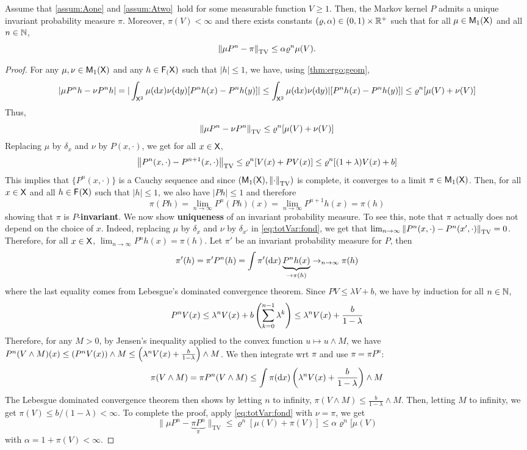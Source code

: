 \documentclass[english,graybox,envcountchap,envcountsame,sectrefs,shortlabels]{svmono}
\theoremstyle{style}
\begin{document}
\begin{corollary} \label{cor:ergod}
Assume that \ref{assum:Aone} and \ref{assum:Atwo}\ hold for some measurable function $V\geq 1$. Then, the Markov kernel $P$ admits a unique invariant probability measure $\pi$. Moreover, $\pi(V)<\infty$ and there exists constants $(\varrho,\alpha) \in (0,1) \times \mathbb{R}^+$ such that for all $\mu\in\mathsf{M}_{1}(\mathsf{X})$ and all $n\in\mathbb{N}$,
$$
\left\|\mu P^n-\pi\right\|_{\mathrm{TV}} \leq \alpha \varrho^n \mu(V)  .
$$
\end{corollary}
\begin{proof}
For any $\mu,\nu \in\mathsf{M}_{1}(\mathsf{X})$ and any $h\in\mathsf{F_{(}}\mathsf{X})$ such that $|h|\leq 1$,  we have, using \autoref{thm:ergo:geom},
$$
|\mu P^n h-\nu P^n h|=|\int_{\mathsf{X}^2}\mu(\mathrm{d} x)\nu(\mathrm{d} y) [P^nh(x)-P^nh(y)]| \leq \int_{\mathsf{X}^2}\mu(\mathrm{d} x)\nu(\mathrm{d} y)| [P^nh(x)-P^nh(y)]| \leq \varrho^n [\mu(V) +\nu(V)]
$$
Thus,
\begin{equation}\label{eq:totVar:fond}
\left\|\mu P^n -\nu P^n\right\|_{\mathrm{TV}}\leq \varrho^n [\mu(V) +\nu(V)]
\end{equation}
Replacing $\mu$ by $\delta_x$ and $\nu$ by $P(x,\cdot)$, we get for all $x\in\mathsf{X}$,
$$
\left\|P^n(x,\cdot) -P^{n+1}(x,\cdot)\right\|_{\mathrm{TV}}\leq \varrho^n [V(x) +PV(x)] \leq \varrho^n [(1+\lambda) V(x)+b]
$$
This implies that $\{P^n(x,\cdot)\}$ is a Cauchy sequence and since $(\mathsf{M}_{1}(\mathsf{X}),\left\|\cdot\right\|_{\mathrm{TV}})$ is complete, it converges to a limit $\pi \in\mathsf{M}_{1}(\mathsf{X})$. Then, for all $x\in\mathsf{X}$ and all  $h\in\mathsf{F_{}}(\mathsf{X})$ such that $|h|\leq 1$, we also have $|Ph|\leq 1$ and therefore
$$
\pi(Ph)=\lim_{n\to\infty} P^n (Ph)(x)=\lim_{n\to\infty} P^{n+1}h(x)=\pi(h)
$$
showing that $\pi$ is $P$-{\bf invariant}. We now show {\bf uniqueness} of an invariant probability measure. To see this, note that $\pi$ actually does not depend on the choice of $x$. Indeed, replacing $\mu$ by $\delta_x$ and $\nu$ by $\delta_{x'}$ in \eqref{eq:totVar:fond}, we get that $\lim_{n\to\infty}\left\|P^n(x,\cdot) -P^{n}(x',\cdot)\right\|_{\mathrm{TV}}=0$. Therefore, for all $x\in\mathsf{X}$, $\lim_{n\to\infty} P^{n}h(x)=\pi(h)$. Let $\pi'$ be an invariant probability measure for $P$, then
$$
\pi'(h)=\pi' P^n(h)=\int \pi'(\mathrm{d} x) \underbrace{P^n h(x)}_{\to \pi(h)} \rightarrow_{n\to\infty} \pi(h)
$$
where the last equality comes from Lebesgue's dominated convergence theorem. Since $PV\leq \lambda V+b$, we have by induction for all $n\in\mathbb{N}$,
$$
P^n V(x)\leq \lambda^n V(x)+b \left(\sum_{k=0}^{n-1}\lambda^k\right) \leq \lambda^n V(x)+\frac{b}{1-\lambda}
$$
Therefore, for any $M>0$, by Jensen's inequality applied to the convex function $u\mapsto u\wedge M$, we have $P^n (V\wedge M)(x) \leq ( P^n V(x))\wedge M \leq \left(\lambda^n V(x)+\frac{b}{1-\lambda}\right) \wedge M$. We then integrate wrt $\pi$ and use $\pi=\pi P^n$:
$$
\pi(V\wedge M)=\pi P^n(V\wedge M) \leq \int \pi(\mathrm{d} x) \left(\lambda^n V(x)+\frac{b}{1-\lambda}\right) \wedge M
$$
The Lebesgue dominated convergence theorem then shows by letting $n$ to infinity, $\pi(V\wedge M)\leq \frac{b}{1-\lambda} \wedge M$. Then, letting $M$ to infinity, we get $\pi(V)\leq b/(1-\lambda)<\infty$. To complete the proof, apply \eqref{eq:totVar:fond} with $\nu=\pi$, we get
$$
\|\mu P^n -\underbrace{\pi P^n}_{\pi}\|_{\mathrm{TV}}\leq \varrho^n [\mu(V) +\pi(V)]\leq \alpha \varrho^n [\mu(V)
$$
with $\alpha=1+\pi(V)<\infty$.
\end{proof}
\end{document}
